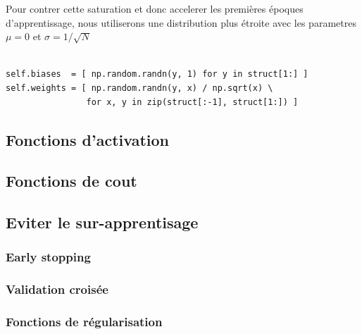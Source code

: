 \documentclass[11pt]{article}
\begin{document}
Pour contrer cette saturation et donc accelerer les premi\`eres \'epoques
d'apprentissage, nous utiliserons une distribution plus \'etroite avec les
parametres $\mu=0$ et $\sigma =1/\sqrt{N}$ \\


 \\
\begin{lstlisting}
self.biases  = [ np.random.randn(y, 1) for y in struct[1:] ]
self.weights = [ np.random.randn(y, x) / np.sqrt(x) \
				for x, y in zip(struct[:-1], struct[1:]) ]
\end{lstlisting}


\subsection{Fonctions d'activation}



\subsection{Fonctions de cout}

\subsection{Eviter le sur-apprentisage}
\subsubsection{Early stopping}
\subsubsection{Validation crois\'ee}
\subsubsection{Fonctions de r\'egularisation}
\end{document}
